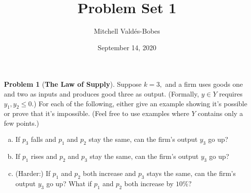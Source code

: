 \documentclass{article}
\title{Problem Set 1}
\author{Mitchell Valdés-Bobes}
\date{September 14, 2020}
\theoremstyle{definition}
\newtheorem{problem}{Problem}
\begin{document}
\maketitle
\begin{problem}[\textbf{The Law of Supply}]



Suppose $k=3,$ and a firm uses goods one and two as inputs and produces good three as output. (Formally, $y \in Y$ requires $y_{1}, y_{2} \leq 0$.) For each of the following, either give an example showing it's possible or prove that it's impossible. (Feel free to use examples where $Y$ contains only a few points.)
\begin{enumerate}[(a)]
    \item If $p_{3}$ falls and $p_{1}$ and $p_{2}$ stay the same, can the firm's output $y_{3}$ go up?
    \item If $p_{1}$ rises and $p_{2}$ and $p_{3}$ stay the same, can the firm's output $y_{3}$ go up?
    \item (Harder:) If $p_{1}$ and $p_{2}$ both increase and $p_{3}$ stays the same, can the firm's output $y_{3}$ go up? What if $p_{1}$ and $p_{2}$ both increase by $10 \% ?$
\end{enumerate}
\end{problem}
\end{document}
